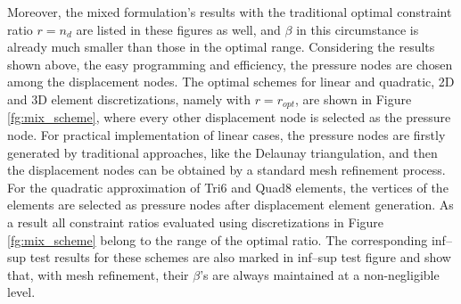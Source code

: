 Moreover, the mixed formulation's results with the traditional optimal constraint ratio $r=n_d$ are listed in these figures as well, and $\beta$ in this circumstance is already much smaller than those in the optimal range. Considering the results shown above, the easy programming and efficiency, the pressure nodes are chosen among the displacement nodes.
The optimal schemes for linear and quadratic, 2D and 3D element discretizations, namely with $r=r_{opt}$, are shown in Figure \ref{fg:mix_scheme},
where every other displacement node is selected as the pressure node.
For practical implementation of linear cases, the pressure nodes are firstly generated by traditional approaches, like the Delaunay triangulation, and then the displacement nodes can be obtained by a standard mesh refinement process.
For the quadratic approximation of Tri6 and Quad8 elements, the vertices of the elements are selected as pressure nodes after displacement element generation.
As a result all constraint ratios evaluated using discretizations in Figure \ref{fg:mix_scheme} belong to the range of the optimal ratio.
The corresponding inf--sup test results for these schemes are also marked in inf--sup test figure and show that, with mesh refinement, their $\beta$'s are always maintained at a non-negligible level.


